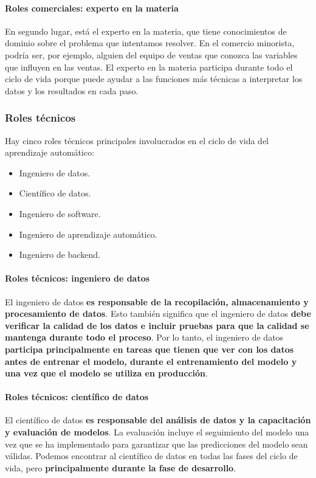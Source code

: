 \documentclass[10pt]{book}
\begin{document}
\paragraph{Roles comerciales: experto en la materia}
En segundo lugar, está el experto en la materia, que tiene conocimientos de dominio sobre el problema que intentamos resolver. En el comercio minorista, podría ser, por ejemplo, alguien del equipo de ventas que conozca las variables que influyen en las ventas. El experto en la materia participa durante todo el ciclo de vida porque puede ayudar a las funciones más técnicas a interpretar los datos y los resultados en cada paso.

\subsubsection{Roles técnicos}
Hay cinco roles técnicos principales involucrados en el ciclo de vida del aprendizaje automático: 
\begin{itemize}
	\item Ingeniero de datos.
	\item Científico de datos.
	\item Ingeniero de software.
	\item Ingeniero de aprendizaje automático.
	\item Ingeniero de backend.
\end{itemize}

\paragraph{Roles técnicos: ingeniero de datos}
El ingeniero de datos \textbf{es responsable de la recopilación, almacenamiento y procesamiento de datos}. Esto también significa que el ingeniero de datos \textbf{debe verificar la calidad de los datos e incluir pruebas para que la calidad se mantenga durante todo el proceso}. Por lo tanto, el ingeniero de datos \textbf{participa principalmente en tareas que tienen que ver con los datos antes de entrenar el modelo, durante el entrenamiento del modelo y una vez que el modelo se utiliza en producción}.

\paragraph{Roles técnicos: científico de datos}
El científico de datos \textbf{es responsable del análisis de datos y la capacitación y evaluación de modelos}. La evaluación incluye el seguimiento del modelo una vez que se ha implementado para garantizar que las predicciones del modelo sean válidas. Podemos encontrar al científico de datos en todas las fases del ciclo de vida, pero \textbf{principalmente durante la fase de desarrollo}.
\end{document}
